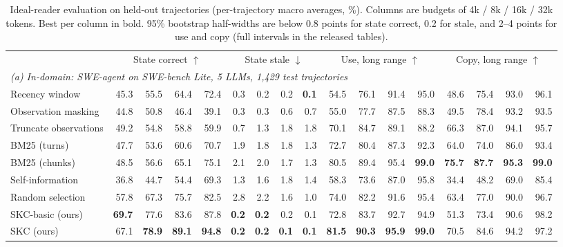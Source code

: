 \begin{table}[t]
\centering
\small
\caption{Ideal-reader evaluation on held-out trajectories (per-trajectory macro
averages, \%). Columns are budgets of 4k / 8k / 16k / 32k tokens. Best per
column in bold. 95\% bootstrap half-widths are below 0.8 points for state
correct, 0.2 for stale, and 2--4 points for use and copy (full intervals in the
released tables).}
\label{tab:main}
\setlength{\tabcolsep}{2.6pt}
\begin{tabular}{l rrrr rrrr rrrr rrrr}
\toprule
 & \multicolumn{4}{c}{State correct $\uparrow$} & \multicolumn{4}{c}{State stale $\downarrow$} & \multicolumn{4}{c}{Use, long range $\uparrow$} & \multicolumn{4}{c}{Copy, long range $\uparrow$} \\
\cmidrule(lr){2-5}\cmidrule(lr){6-9}\cmidrule(lr){10-13}\cmidrule(lr){14-17}
\multicolumn{17}{l}{\emph{(a) In-domain: SWE-agent on SWE-bench Lite, 5 LLMs, 1{,}429 test trajectories}} \\
Recency window & 45.3 & 55.5 & 64.4 & 72.4 & 0.3 & 0.2 & 0.2 & \textbf{0.1} & 54.5 & 76.1 & 91.4 & 95.0 & 48.6 & 75.4 & 93.0 & 96.1 \\
Observation masking & 44.8 & 50.8 & 46.4 & 39.1 & 0.3 & 0.3 & 0.6 & 0.7 & 55.0 & 77.7 & 87.5 & 88.3 & 49.5 & 78.4 & 93.2 & 93.5 \\
Truncate observations & 49.2 & 54.8 & 58.8 & 59.9 & 0.7 & 1.3 & 1.8 & 1.8 & 70.1 & 84.7 & 89.1 & 88.2 & 66.3 & 87.0 & 94.1 & 95.7 \\
BM25 (turns) & 47.7 & 53.6 & 60.6 & 70.7 & 1.9 & 1.8 & 1.8 & 1.3 & 72.7 & 80.4 & 87.3 & 92.3 & 64.0 & 74.0 & 86.0 & 93.4 \\
BM25 (chunks) & 48.5 & 56.6 & 65.1 & 75.1 & 2.1 & 2.0 & 1.7 & 1.3 & 80.5 & 89.4 & 95.4 & \textbf{99.0} & \textbf{75.7} & \textbf{87.7} & \textbf{95.3} & \textbf{99.0} \\
Self-information & 36.8 & 44.7 & 54.4 & 69.3 & 1.3 & 1.6 & 1.8 & 1.4 & 58.3 & 73.6 & 87.0 & 95.8 & 34.4 & 48.2 & 69.0 & 85.4 \\
Random selection & 57.8 & 67.3 & 75.7 & 82.5 & 2.8 & 2.2 & 1.6 & 1.0 & 74.0 & 82.2 & 91.6 & 95.4 & 63.4 & 77.0 & 90.0 & 96.7 \\
SKC-basic (ours) & \textbf{69.7} & 77.6 & 83.6 & 87.8 & \textbf{0.2} & \textbf{0.2} & 0.2 & 0.1 & 72.8 & 83.7 & 92.7 & 94.9 & 51.3 & 73.4 & 90.6 & 98.2 \\
SKC (ours) & 67.1 & \textbf{78.9} & \textbf{89.1} & \textbf{94.8} & \textbf{0.2} & \textbf{0.2} & \textbf{0.1} & \textbf{0.1} & \textbf{81.5} & \textbf{90.3} & \textbf{95.9} & \textbf{99.0} & 70.5 & 84.6 & 94.2 & 97.2 \\

\end{tabular}
\end{table}
